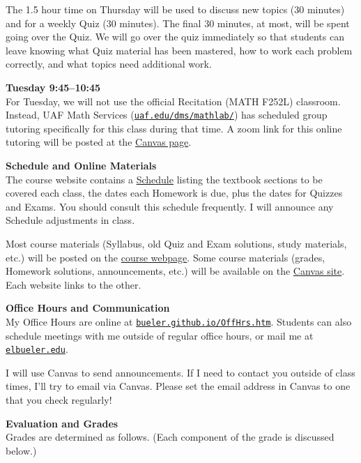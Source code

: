 \documentclass[12pt]{article}
\renewcommand{\emph}[1]{\textsf{\textbf{#1}}}
\newcommand{\localhead}[1]{\par\smallskip\textbf{#1} \smallskip\nobreak\\}%
\def\heading#1{\localhead{\large\emph{#1}}}
\begin{document}
The 1.5 hour time on Thursday will be used to discuss new topics (30 minutes) and for a weekly Quiz (30 minutes).  The final 30 minutes, at most, will be spent going over the Quiz.  We will go over the quiz immediately so that students can leave knowing what Quiz material has been mastered, how to work each problem correctly, and what topics need additional work. 

\clearpage\newpage

\strut \vspace{-12pt}

\heading{Tuesday 9:45--10:45} 
For Tuesday, we will not use the official Recitation (MATH F252L) classroom.  Instead, UAF Math Services (\href{https://uaf.edu/dms/mathlab/}{\texttt{uaf.edu/dms/mathlab/}}) has scheduled group tutoring specifically for this class during that time.  A zoom link for this online tutoring will be posted at the \href{https://canvas.alaska.edu/courses/9933}{Canvas page}.


\heading{Schedule and Online Materials}
The course website contains a \href{https://bueler.github.io/calc2/schedule.pdf}{Schedule} listing the textbook sections to be covered each class, the dates each Homework is due, plus the dates for Quizzes and Exams. You should consult this schedule frequently.  I will announce any Schedule adjustments in class.

Most course materials (Syllabus, old Quiz and Exam solutions, study materials, etc.) will be posted on the \href{https://bueler.github.io/calc2/}{course webpage}.  Some course materials (grades, Homework solutions, announcements, etc.) will be available on the \href{https://canvas.alaska.edu/courses/9933}{Canvas site}.  Each website links to the other.


\heading{Office Hours and Communication}
My Office Hours are online at \href{http://bueler.github.io/OffHrs.htm}{\texttt{bueler.github.io/OffHrs.htm}}.  Students can also schedule meetings with me outside of regular office hours, or mail me at \href{mailto:elbueler@alaska.edu}{\texttt{elbueler\@@alaska.edu}}.

I will use Canvas to send announcements.  If I need to contact you outside of class times, I'll try to email via Canvas.  Please set the email address in Canvas to one that you check regularly!




\heading{Evaluation and Grades}
Grades are determined as follows.  (Each component of the grade is discussed below.)
 
\end{document}
